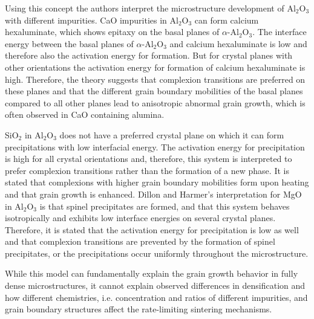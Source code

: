 Using this concept the authors interpret the microstructure development of Al$_{2}$O$_{3}$ with different impurities. CaO impurities in Al$_{2}$O$_{3}$ can form calcium hexaluminate, which shows epitaxy on the basal planes of $\alpha$-Al$_{2}$O$_{3}$. The interface energy between the basal planes of $\alpha$-Al$_{2}$O$_{3}$ and calcium hexaluminate is low and therefore also the activation energy for formation. But for crystal planes with other orientations the activation energy for formation of calcium hexaluminate is high. Therefore, the theory suggests that complexion transitions are preferred on these planes and that the different grain boundary mobilities of the basal planes compared to all other planes lead to anisotropic abnormal grain growth, which is often observed in CaO containing alumina. 

SiO$_{2}$ in Al$_{2}$O$_{3}$ does not have a preferred crystal plane on which it can form precipitations with low interfacial energy. The activation energy for precipitation is high for all crystal orientations and, therefore, this system is interpreted to prefer complexion transitions rather than the formation of a new phase. It is stated that complexions with higher grain boundary mobilities form upon heating and that grain growth is enhanced. Dillon and Harmer's \cite{Dillon2007a,Dillon2008} interpretation for MgO in Al$_{2}$O$_{3}$ is that spinel precipitates are formed, and that this system behaves isotropically and exhibits low interface energies on several crystal planes. Therefore, it is stated that the activation energy for precipitation is low as well and that complexion transitions are prevented by the formation of spinel precipitates, or the precipitations occur uniformly throughout the microstructure. 

While this model can fundamentally explain the grain growth behavior in fully dense microstructures, it cannot explain observed differences in densification and how different chemistries, i.e. concentration and ratios of different impurities, and grain boundary structures affect the rate-limiting sintering mechanisms. 


